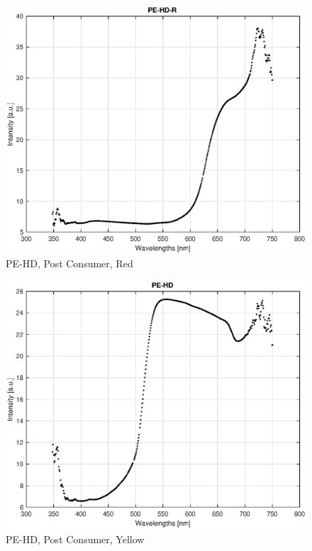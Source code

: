\begin{appendices}
\begin{figure}
    \centering
    \includegraphics[width = 12cm]{Images/appendix/pe-hd-postconsum-red.eps}
    \caption{PE-HD, Post Consumer, Red}
    \label{fig:pehd-red}
\end{figure}

\begin{figure}
    \centering
    \includegraphics[width = 12cm]{Images/appendix/pe-hd-postconsum.eps}
    \caption{PE-HD, Post Consumer, Yellow}
    \label{fig:pehd-yellow}
\end{figure}


\end{appendices}
